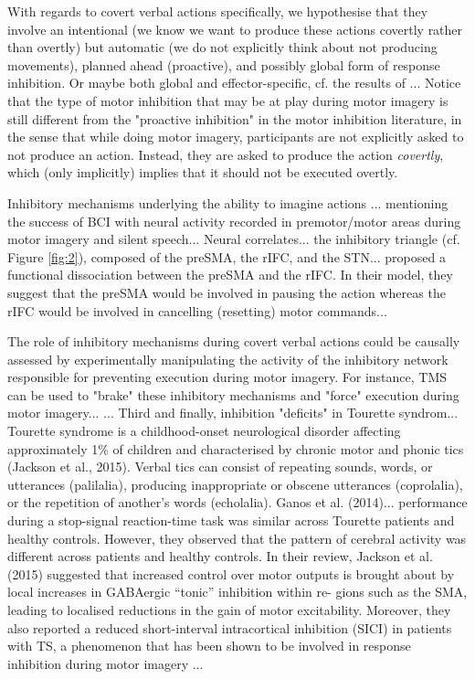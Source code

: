 \documentclass[utf8]{template/frontiersSCNS} %
\begin{document}
With regards to covert verbal actions specifically, we hypothesise that they involve an intentional (we know we want to produce these actions covertly rather than overtly) but automatic (we do not explicitly think about not producing movements), planned ahead (proactive), and possibly global form of response inhibition. Or maybe both global and effector-specific, cf. the results of \cite{rieger_inhibition_2017}... Notice that the type of motor inhibition that may be at play during motor imagery is still different from the "proactive inhibition" in the motor inhibition literature, in the sense that while doing motor imagery, participants are not explicitly asked to not produce an action. Instead, they are asked to produce the action \textit{covertly}, which (only implicitly) implies that it should not be executed overtly.

Inhibitory mechanisms underlying the ability to imagine actions \citep{guillot_imagining_2012, schwoebel_man_2002}... mentioning the success of BCI with neural activity recorded in premotor/motor areas during motor imagery and silent speech... Neural correlates... the inhibitory triangle (cf. Figure \ref{fig:2}), composed of the preSMA, the rIFC, and the STN... \cite{diesburg_pause-then-cancel_2021} proposed a functional dissociation between the preSMA and the rIFC. In their model, they suggest that the preSMA would be involved in pausing the action whereas the rIFC would be involved in cancelling (resetting) motor commands...

The role of inhibitory mechanisms during covert verbal actions could be causally assessed by experimentally manipulating the activity of the inhibitory network responsible for preventing execution during motor imagery. For instance, TMS can be used to "brake" these inhibitory mechanisms and "force" execution during motor imagery... \citep{angelini_motor_2015, angelini_proactive_2016}... Third and finally, inhibition "deficits" in Tourette syndrom... Tourette syndrome is a childhood-onset neurological disorder affecting approximately 1\% of children and characterised by chronic motor and phonic tics (Jackson et al., 2015). Verbal tics can consist of repeating sounds, words, or utterances (palilalia), producing inappropriate or obscene utterances (coprolalia), or the repetition of another’s words (echolalia). Ganos et al. (2014)...  performance during a stop-signal reaction-time task was similar across Tourette patients and healthy controls. However, they observed that the pattern of cerebral activity was different across patients and healthy controls. In their review, Jackson et al. (2015) suggested that increased control over motor outputs is brought about by local increases in GABAergic “tonic” inhibition within re- gions such as the SMA, leading to localised reductions in the gain of motor excitability. Moreover, they also reported a reduced short-interval intracortical inhibition (SICI) in patients with TS, a phenomenon that has been shown to be involved in response inhibition during motor imagery \citep{neige_unravelling_2020}...
\end{document}

